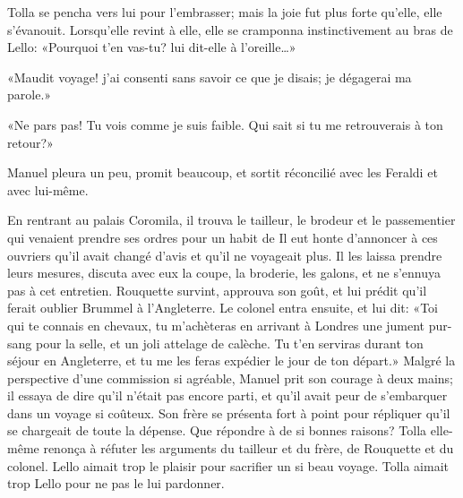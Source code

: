 Tolla se pencha vers lui pour l'embrasser; mais la joie fut plus forte qu'elle, elle s'évanouit. Lorsqu'elle revint à elle, elle se cramponna instinctivement au bras de Lello: «Pourquoi t'en vas-tu? lui dit-elle à l'oreille\ldots{}»

«Maudit voyage! j'ai consenti sans savoir ce que je disais; je dégagerai ma parole.»

«Ne pars pas! Tu vois comme je suis faible. Qui sait si tu me retrouverais à ton retour?»

Manuel pleura un peu, promit beaucoup, et sortit réconcilié avec les Feraldi et avec lui-même.

En rentrant au palais Coromila, il trouva le tailleur, le brodeur et le passementier qui venaient prendre ses ordres pour un habit de Il eut honte d'annoncer à ces ouvriers qu'il avait changé d'avis et qu'il ne voyageait plus. Il les laissa prendre leurs mesures, discuta avec eux la coupe, la broderie, les galons, et ne s'ennuya pas à cet entretien. Rouquette survint, approuva son goût, et lui prédit qu'il ferait oublier Brummel à l'Angleterre. Le colonel entra ensuite, et lui dit: «Toi qui te connais en chevaux, tu m'achèteras en arrivant à Londres une jument pur-sang pour la selle, et un joli attelage de calèche. Tu t'en serviras durant ton séjour en Angleterre, et tu me les feras expédier le jour de ton départ.» Malgré la perspective d'une commission si agréable, Manuel prit son courage à deux mains; il essaya de dire qu'il n'était pas encore parti, et qu'il avait peur de s'embarquer dans un voyage si coûteux. Son frère se présenta fort à point pour répliquer qu'il se chargeait de toute la dépense. Que répondre à de si bonnes raisons? Tolla elle-même renonça à réfuter les arguments du tailleur et du frère, de Rouquette et du colonel. Lello aimait trop le plaisir pour sacrifier un si beau voyage. Tolla aimait trop Lello pour ne pas le lui pardonner.

\enlargethispage{3em}

